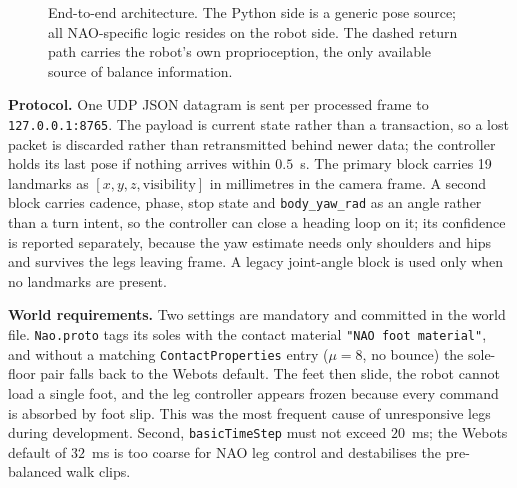 \documentclass[twocolumn]{article}
\begin{document}
\begin{figure}[t]
\caption{End-to-end architecture. The Python side is a generic pose source; all NAO-specific
logic resides on the robot side. The dashed return path carries the robot's own
proprioception, the only available source of balance information.}
\label{fig:arch}
\end{figure}

\textbf{Protocol.} One UDP JSON datagram is sent per processed frame to
\texttt{127.0.0.1:8765}. The payload is current state rather than a transaction, so a lost
packet is discarded rather than retransmitted behind newer data; the controller holds its last
pose if nothing arrives within $0.5$~s. The primary block carries 19 landmarks as
$[x, y, z, \text{visibility}]$ in millimetres in the camera frame. A second block carries
cadence, phase, stop state and \texttt{body\_yaw\_rad} as an angle rather than a turn intent,
so the controller can close a heading loop on it; its confidence is reported separately,
because the yaw estimate needs only shoulders and hips and survives the legs leaving frame. A
legacy joint-angle block is used only when no landmarks are present.

\textbf{World requirements.} Two settings are mandatory and committed in the world file.
\texttt{Nao.proto} tags its soles with the contact material \texttt{"NAO foot material"}, and
without a matching \texttt{ContactProperties} entry ($\mu = 8$, no bounce) the sole-floor pair
falls back to the Webots default. The feet then slide, the robot cannot load a single foot,
and the leg controller appears frozen because every command is absorbed by foot slip. This was
the most frequent cause of unresponsive legs during development. Second,
\texttt{basicTimeStep} must not exceed $20$~ms; the Webots default of $32$~ms is too coarse
for NAO leg control and destabilises the pre-balanced walk clips.
\end{document}
